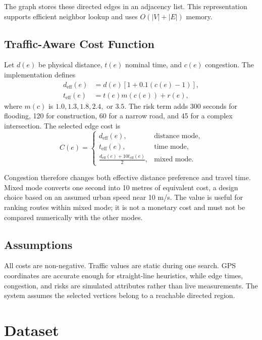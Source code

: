 \documentclass[12pt,a4paper,oneside]{report}
\begin{document}
The graph stores these directed edges in an adjacency list. This representation
supports efficient neighbor lookup and uses $O(|V|+|E|)$ memory.

\section{Traffic-Aware Cost Function}
Let $d(e)$ be physical distance, $t(e)$ nominal time, and $c(e)$ congestion.
The implementation defines
\begin{align}
d_{\mathrm{eff}}(e)&=d(e)[1+0.1(c(e)-1)],\\
t_{\mathrm{eff}}(e)&=t(e)m(c(e))+r(e),
\end{align}
where $m(c)$ is $1.0,1.3,1.8,2.4,$ or $3.5$. The risk term adds 300 seconds for
flooding, 120 for construction, 60 for a narrow road, and 45 for a complex
intersection. The selected edge cost is
\begin{equation}
C(e)=\begin{cases}
d_{\mathrm{eff}}(e),&\text{distance mode},\\
t_{\mathrm{eff}}(e),&\text{time mode},\\
\frac{d_{\mathrm{eff}}(e)+10t_{\mathrm{eff}}(e)}{2},&\text{mixed mode}.
\end{cases}
\label{eq:cost}
\end{equation}

Congestion therefore changes both effective distance preference and travel
time. Mixed mode converts one second into 10 metres of equivalent cost, a design
choice based on an assumed urban speed near 10 m/s. The value is useful for
ranking routes within mixed mode; it is not a monetary cost and must not be
compared numerically with the other modes.

\section{Assumptions}
All costs are non-negative. Traffic values are static during one search. GPS
coordinates are accurate enough for straight-line heuristics, while edge times,
congestion, and risks are simulated attributes rather than live measurements.
The system assumes the selected vertices belong to a reachable directed region.

\chapter{Dataset}
\end{document}
